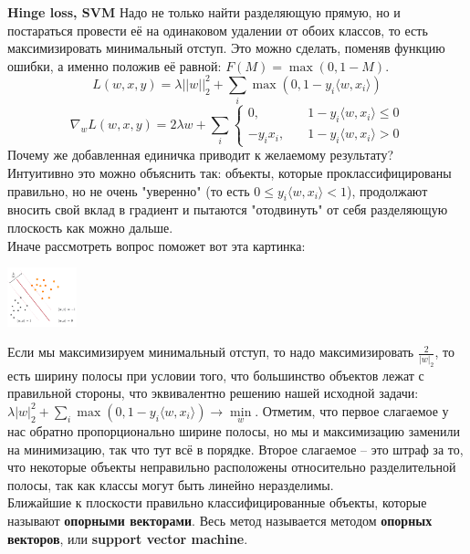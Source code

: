 \textbf{Hinge loss, SVM} Надо не только найти разделяющую прямую, но и постараться провести её на одинаковом удалении от обоих классов, то есть максимизировать минимальный отступ.
Это можно сделать, поменяв функцию ошибки, а именно положив её равной:
$F(M) = \max(0, 1-M)$.
$$L(w, x, y) = \lambda||w||^2_2 + \sum_i \max(0, 1-y_i \langle w, x_i\rangle)$$
$$\nabla_w L(w, x, y) = 2 \lambda w + \sum_i
        \begin{cases} 
             0,      & \quad      1 - y_i \langle w, x_i \rangle \leq 0 \\ 
            - y_i x_i, & \quad   1 - y_i \langle w, x_i \rangle > 0
        \end{cases}$$ 
Почему же добавленная единичка приводит к желаемому результату? \\ Интуитивно это можно объяснить так: объекты, которые проклассифицированы правильно, но не очень "уверенно" (то есть $0 \leq y_i \langle w, x_i\rangle < 1$), продолжают вносить свой вклад в градиент и пытаются "отодвинуть" от себя разделяющую плоскость как можно дальше. \\
Иначе рассмотреть вопрос поможет вот эта картинка:

\includegraphics[width=0.15\textwidth]{pics/t_osn24_5.png}


Если мы максимизируем минимальный отступ, то надо максимизировать $\frac{2}{|w|_2}$, то есть ширину полосы при условии того, что большинство объектов лежат с правильной стороны, что эквивалентно решению нашей исходной задачи:
$\lambda|w|^2_2 + \sum_i \max(0, 1-y_i \langle w, x_i\rangle) \longrightarrow\min\limits_{w}$.
Отметим, что первое слагаемое у нас обратно пропорционально ширине полосы, но мы и максимизацию заменили на минимизацию, так что тут всё в порядке. Второе слагаемое – это штраф за то, что некоторые объекты неправильно расположены относительно разделительной полосы, так как классы могут быть линейно неразделимы. \\
Ближайшие к плоскости правильно классифицированные объекты, которые называют \textbf{опорными векторами}. Весь метод называется методом \textbf{опорных векторов}, или \textbf{support vector machine}. 
